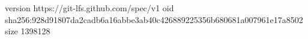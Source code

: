 version https://git-lfs.github.com/spec/v1
oid sha256:928d91807da2cadb6a16abbe3ab40c426889225356b680681a007961e17a8502
size 1398128
